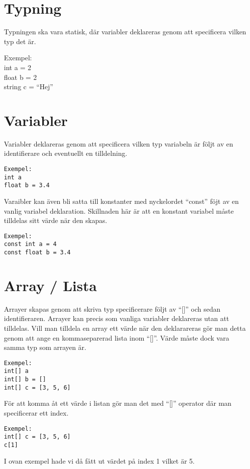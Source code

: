 \documentclass{TDP003mall}
\begin{document}
    \section{Typning}
    Typningen ska vara statisk, där variabler deklareras genom att specificera vilken typ det är.

    Exempel: \\
    int a = 2 \\
    float b = 2 \\
    string c = ``Hej''

    \section{Variabler}
    Variabler deklareras genom att specificera vilken typ variabeln är följt av en identifierare och eventuellt en tilldelning.

\begin{verbatim}
Exempel:
int a
float b = 3.4
\end{verbatim}

Varaibler kan även bli satta till konstanter med nyckelordet ``const'' föjt av en vanlig variabel deklaration. Skillnaden här är att en konstant variabel måste tilldelas sitt värde när den skapas.

\begin{verbatim}
Exempel:
const int a = 4
const float b = 3.4
\end{verbatim}
\section{Array / Lista}
Arrayer skapas genom att skriva typ specificerare följt av ``[]'' och sedan identifieraren. Arrayer kan precis som vanliga variabler deklareras utan att tilldelas. Vill man tilldela en array ett värde när den deklarareras gör man detta genom att ange en kommaseparerad lista inom ``[]''. Värde måste dock vara samma typ som arrayen är.

\begin{verbatim}
Exempel:
int[] a
int[] b = []
int[] c = [3, 5, 6]
\end{verbatim}

För att komma åt ett värde i listan gör man det med ``[]'' operator där man specificerar ett index.

\begin{verbatim}
Exempel:
int[] c = [3, 5, 6]
c[1]
\end{verbatim}

I ovan exempel hade vi då fått ut värdet på index 1 vilket är 5.
\end{document}
